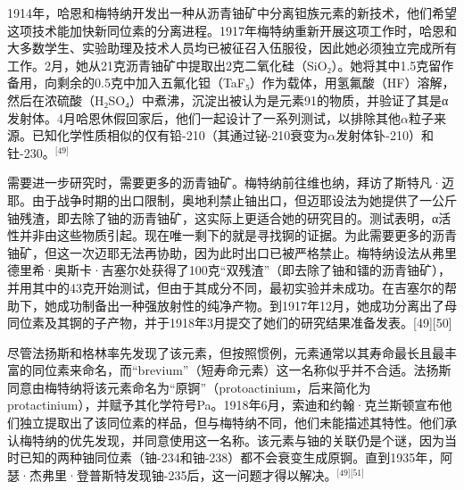1914年，哈恩和梅特纳开发出一种从沥青铀矿中分离钽族元素的新技术，他们希望这项技术能加快新同位素的分离进程。1917年梅特纳重新开展这项工作时，哈恩和大多数学生、实验助理及技术人员均已被征召入伍服役，因此她必须独立完成所有工作。2月，她从21克沥青铀矿中提取出2克二氧化硅（SiO₂）。她将其中1.5克留作备用，向剩余的0.5克中加入五氟化钽（TaF₅）作为载体，用氢氟酸（HF）溶解，然后在浓硫酸（H₂SO₄）中煮沸，沉淀出被认为是元素91的物质，并验证了其是α发射体。4月哈恩休假回家后，他们一起设计了一系列测试，以排除其他$\alpha$粒子来源。已知化学性质相似的仅有铅-210（其通过铋-210衰变为$\alpha$发射体钋-210）和钍-230。\(^\text{[49]}\)

需要进一步研究时，需要更多的沥青铀矿。梅特纳前往维也纳，拜访了斯特凡·迈耶。由于战争时期的出口限制，奥地利禁止铀出口，但迈耶设法为她提供了一公斤铀残渣，即去除了铀的沥青铀矿，这实际上更适合她的研究目的。测试表明，α活性并非由这些物质引起。现在唯一剩下的就是寻找锕的证据。为此需要更多的沥青铀矿，但这一次迈耶无法再协助，因为此时出口已被严格禁止。梅特纳设法从弗里德里希·奥斯卡·吉塞尔处获得了100克“双残渣”（即去除了铀和镭的沥青铀矿），并用其中的43克开始测试，但由于其成分不同，最初实验并未成功。在吉塞尔的帮助下，她成功制备出一种强放射性的纯净产物。到1917年12月，她成功分离出了母同位素及其锕的子产物，并于1918年3月提交了她们的研究结果准备发表。[49][50]

尽管法扬斯和格林率先发现了该元素，但按照惯例，元素通常以其寿命最长且最丰富的同位素来命名，而“brevium”（短寿命元素）这一名称似乎并不合适。法扬斯同意由梅特纳将该元素命名为“原锕”（protoactinium，后来简化为protactinium），并赋予其化学符号Pa。1918年6月，索迪和约翰·克兰斯顿宣布他们独立提取出了该同位素的样品，但与梅特纳不同，他们未能描述其特性。他们承认梅特纳的优先发现，并同意使用这一名称。该元素与铀的关联仍是个谜，因为当时已知的两种铀同位素（铀-234和铀-238）都不会衰变生成原锕。直到1935年，阿瑟·杰弗里·登普斯特发现铀-235后，这一问题才得以解决。\(^\text{[49][51]}\)
